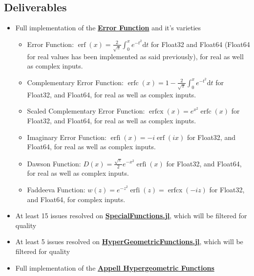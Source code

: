 \documentclass{article}
\theoremstyle{mytheoremstyle}
\theoremstyle{mytheoremstyle}
\theoremstyle{myproblemstyle}
\begin{document}
    \subsection*{Deliverables}
      \begin{itemize}
        \item Full implementation of the \href{https://github.com/JuliaMath/SpecialFunctions.jl/blob/master/src/erf.jl}{\textbf{Error Function}} and it's varieties \cite{error function}
          \begin{itemize}
            \item Error Function: $\operatorname{erf } (x)=\frac{2 }{\sqrt{\pi } }\int_{0}^{x} e ^{-t^2}\text{d}t$ for Float32 and Float64 (Float64 for real values has been implemented as said previously), for real as well as complex inputs.
            \item Complementary Error Function: $\operatorname{erfc } (x)=1- \frac{2 }{\sqrt{\pi } }\int_{0}^{x} e ^{-t^2}\text{d}t$ for Float32, and Float64, for real as well as complex inputs.
            \item Scaled Complementary Error Function: $\operatorname{erfcx } (x)=e ^{x^2 } \operatorname{erfc} (x)$ for Float32, and Float64, for real as well as complex inputs.
            \item Imaginary Error Function: $\operatorname{erfi } (x)= -i \operatorname{erf} (ix)$ for Float32, and Float64, for real as well as complex inputs.
            \item Dawson Function: $D (x)=\frac{\sqrt{\pi } }{2 }e ^{-x^2 } \operatorname{erfi} (x)$ for Float32, and Float64, for real as well as complex inputs.
            \item Faddeeva Function: $w (z)=e ^{-z^2 } \operatorname{erfi} (z)= \operatorname{erfcx}(-iz)$ for Float32, and Float64, for complex inputs.
          \end{itemize}
        \item At least 15 issues resolved on \href{https://github.com/JuliaMath/SpecialFunctions.jl/issues}{\textbf{SpecialFunctions.jl}}, which will be filtered for quality
        \item At least 5 issues resolved on \href{https://github.com/JuliaMath/HypergeometricFunctions.jl/issues}{\textbf{HyperGeometricFunctions.jl}}, which will be filtered for quality
        \item Full implementation of the \href{https://en.wikipedia.org/wiki/Appell_series}{\textbf{Appell Hypergeometric Functions}} \cite{appell} 

\end{itemize}
\end{document}
